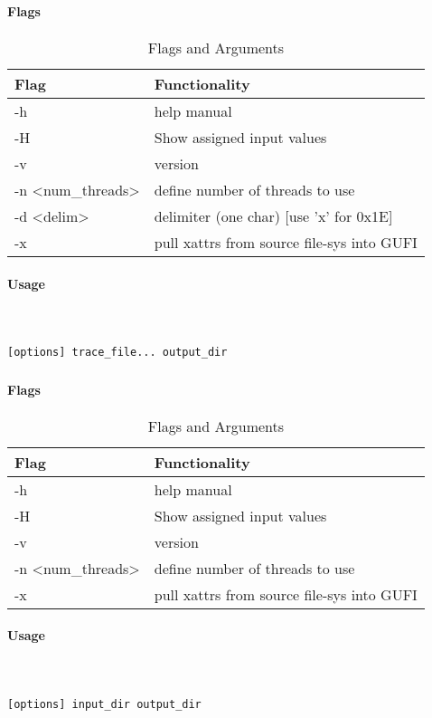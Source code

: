 \subsubsection{\gufitracedir}
\paragraph{Flags}
\begin{table} [H]
  \centering
  \begin{tabular}{l|l}
    Flag & Functionality \\
    \hline
    -h & help manual \\
    \hline
    -H & Show assigned input values \\
    \hline
    -v & version \\
    \hline
    -n \textless num\_threads\textgreater & define number of threads to use \\
    \hline
    -d \textless delim\textgreater & delimiter (one char)  [use 'x' for 0x1E] \\
    \hline
    -x & pull xattrs from source file-sys into GUFI \\
    \hline
  \end{tabular}
  \caption{\gufitracedir Flags and Arguments}
\end{table}

\paragraph{Usage} ~\\\\
\gufitracedir \texttt{[options] trace\_file... output\_dir}

\subsubsection{\gufiindexdir}
\paragraph{Flags}
\begin{table} [H]
  \centering
  \begin{tabular}{l|l}
    Flag & Functionality \\
    \hline
    -h & help manual \\
    \hline
    -H & Show assigned input values \\
    \hline
    -v & version \\
    \hline
    -n \textless num\_threads\textgreater & define number of threads to use \\
    \hline
    -x & pull xattrs from source file-sys into GUFI \\
    \hline
  \end{tabular}
  \caption{\gufiindexdir Flags and Arguments}
\end{table}

\paragraph{Usage} ~\\\\
\gufiindexdir \texttt{[options] input\_dir output\_dir}
